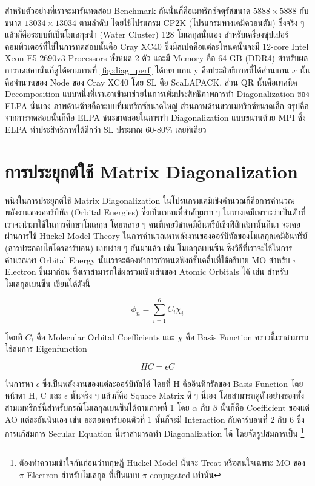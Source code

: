 สำหรับตัวอย่างที่เราจะมารันทดสอบ Benchmark กันนัั้นก็คือเมทริกซ์จตุรัสขนาด $5888 \times 5888$ กับขนาด $13034 \times 13034$
ตามลำดับ โดยใช้โปรแกรม CP2K (โปรแกรมทางเคมีควอนตัม) ซึ่งจริง ๆ แล้วก็คือระบบที่เป็นโมเลกุลน้ำ (Water Cluster) 128 โมเลกุลนั่นเอง
สำหรับเครื่องซุปเปอร์คอมพิวเตอร์ที่ใช้ในการทดสอบนั้นคือ Cray XC40 ซึ่งมีสเปคคือแต่ละโหนดนั้นจะมี 12-core Intel Xeon E5-2690v3 Processors
ทั้งหมด 2 ตัว และมี Memory คือ 64 GB (DDR4) สำหรับผลการทดสอบนั้นก็ดูได้ตามภาพที่ \ref{fig:diag_perf} ได้เลย แกน y
คือประสิทธิภาพที่ได้ส่วนแกน $x$ นั้นคือจำนวนของ Node ของ Cray XC40 โดย SL คือ ScaLAPACK, ส่วน QR นั้นคือเทคนิค Decomposition
แบบหนึ่งที่เราเอาเข้ามาช่วยในการเพิ่มประสิทธิภาพการทำ Diagonalization ของ ELPA นั่นเอง ภาพด้านซ้ายคือระบบที่เมทริกซ์ขนาดใหญ่
ส่วนภาพด้านขวาเมทริกซ์ขนาดเล็ก สรุปคือจากการทดสอบนั้นก็คือ ELPA ชนะขาดลอยในการทำ Diagonalization แบบขนานด้วย MPI ซึ่ง ELPA
ทำประสิทธิภาพได้ดีกว่า SL ประมาณ 60-80\% เลยทีเดียว

\section{การประยุกต์ใช้ Matrix Diagonalization}

หนึ่งในการประยุกต์ใช้ Matrix Diagonalization ในโปรแกรมเคมีเชิงคำนวณก็คือการคำนวณพลังงานของออร์บิทัล (Orbital Energies)
ซึ่งเป็นเทอมที่สำคัญมาก ๆ ในทางเคมีเพราะว่าเป็นตัวที่เราจะนำมาใช้ในการศึกษาโมเลกุล โดยหลาย ๆ คนที่เคยวิชาเคมีอินทรีย์เชิงฟิสิกส์มานั้นก็น่า%
จะเคยผ่านการใช้ H\"{u}ckel Model Theory ในการคำนวณหาพลังงานของออร์บิทัลของโมเลกุลเคมีอินทรีย์ (สารประกอบไฮโดรคาร์บอน) แบบง่าย ๆ
กันมาแล้ว เช่น โมเลกุลเบนซีน ซึ่งวิธีที่เราจะใช้ในการคำนวณหา Orbital Energy นั้นเราจะต้องทำการกำหนดฟังก์ชันคลื่นที่ใช้อธิบาย MO สำหรับ
$\pi$ Electron ขึ้นมาก่อน ซึ่งเราสามารถใช้ผลรวมเชิงเส้นของ Atomic Orbitals ได้ เช่น สำหรับโมเลกุลเบนซีน เขียนได้ดังนี้

\begin{equation}
  \phi_{n} = \sum_{i=1}^{6} C_{i} \chi_{i}
\end{equation}

\noindent โดยที่ $C_{i}$ คือ Molecular Orbital Coefficients และ $\chi$ คือ Basis Function คราวนี้เราสามารถใช้สมการ
Eigenfunction

\begin{equation}
  HC = \epsilon C
\end{equation}

\noindent ในการหา $\epsilon$ ซึ่งเป็นพลังงานของแต่ละออร์บิทัลได้ โดยที่ H คืออินทิกรัลของ Basis Function โดยหน้าตา H, C และ
$\epsilon$ นั้นจริง ๆ แล้วก็คือ Square Matrix ดี ๆ นี่เอง โดยสามารถดูตัวอย่างของทั้งสามเมทริกซ์นี้สำหรับกรณีโมเลกุลเบนซีนได้ตามภาพที่ 1
โดย $\alpha$ กับ $\beta$ นั้นก็คือ Coefficient ของแต่ AO แต่ละอันนั่นเอง เช่น อะตอมคาร์บอนตัวที่ 1 นั้นก็จะมี Interaction
กับคาร์บอนที่ 2 กับ 6 ซึ่งการแก้สมการ Secular Equation นี้เราสามารถทำ Diagonalization ได้ โดยจัดรูปสมการเป็น%
\footnote{ต้องทำความเข้าใจกันก่อนว่าทฤษฎี H\"{u}ckel Model นั้นจะ Treat หรือสนใจเฉพาะ MO ของ $\pi$ Electron สำหรับโมเลกุล%
ที่เป็นแบบ $\pi$-conjugated เท่านั้น}

